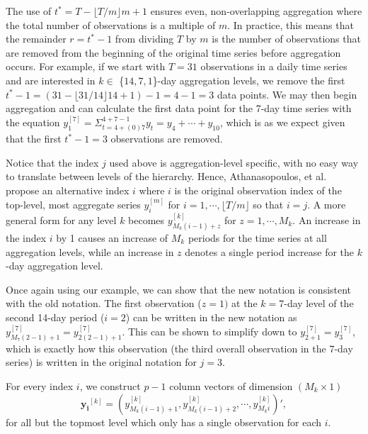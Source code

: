 \documentclass[thesis]{umassthesis}  %
\begin{document}
The use of $t^*= T - \lfloor T/m\rfloor m + 1$ ensures even, non-overlapping aggregation where the total number of observations is a multiple of $m$. In practice, this means that the remainder $r = t^*-1$ from dividing $T$ by $m$ is the number of observations that are removed from the beginning of the original time series before aggregation occurs. For example, if we start with $T = 31$ observations in a daily time series and are interested in $k \in$ \{$14, 7, 1$\}-day aggregation levels, we remove the first $t^*-1= (31 - \lfloor 31/14 \rfloor 14 + 1) - 1 = 4 - 1 = 3$ data points. We may then begin aggregation and can calculate the first data point for the 7-day time series with the equation $y_1^{[7]} = \Sigma_{t = 4 + (0)7}^{4+7-1} y_t = y_{4} + \cdots + y_{10}$, which is as we expect given that the first $t^*-1 = 3$ observations are removed.

Notice that the index $j$ used above is aggregation-level specific, with no easy way to translate between levels of the hierarchy. Hence, Athanasopoulos, et al. propose an alternative index $i$ where $i$ is the original observation index of the top-level, most aggregate series $y_i^{[m]}$ for $i=1, \cdots, \lfloor T/m \rfloor$ so that $i=j$. A more general form for any level $k$ becomes $y_{M_k(i-1)+z}^{[k]}$ for $z = 1, \cdots, M_k$. An increase in the index $i$ by 1 causes an increase of $M_k$ periods for the time series at all aggregation levels, while an increase in $z$ denotes a single period increase for the $k$-day aggregation level.

Once again using our example, we can show that the new notation is consistent with the old notation. The first observation ($z=1)$ at the $k = 7$-day level of the second 14-day period ($i = 2$) can be written in the new notation as $y_{M_7(2-1)+1}^{[7]} = y_{2(2-1)+1}^{[7]}$. This can be shown to simplify down to $y_{2+1}^{[7]} = y_3^{[7]}$, which is exactly how this observation (the third overall observation in the 7-day series) is written in the original notation for $j = 3$.

For every index $i$, we construct $p-1$ column vectors of dimension $(M_k \times 1)$ \[\boldsymbol{y_i}^{[k]} = (y_{M_k(i-1)+1}^{[k]}, y_{M_k(i-1)+2}^{[k]}, \cdots, y_{M_ki}^{[k]})',\] for all but the topmost level which only has a single observation for each $i$.
\end{document}
